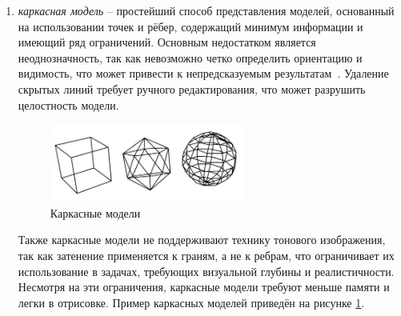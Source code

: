 \begin{enumerate}
	\item \textit{каркасная модель} -- простейший способ представления моделей, основанный на использовании точек и рёбер, содержащий минимум информации и имеющий ряд ограничений. Основным недостатком является неоднозначность, так как невозможно четко определить ориентацию и видимость, что может привести к непредсказуемым результатам~\cite{lit1}. Удаление скрытых линий требует ручного редактирования, что может разрушить целостность модели. 
	\begin{figure}[h] 
		\centering
		\includegraphics[width=0.6\textwidth]{images/carcass-models.png}
		\caption{Каркасные модели} 
		\label{fig:carcass-models} 
	\end{figure}
	Также каркасные модели не поддерживают технику тонового изображения, так как затенение применяется к граням, а не к ребрам, что ограничивает их использование в задачах, требующих визуальной глубины и реалистичности. Несмотря на эти ограничения, каркасные модели требуют меньше памяти и легки в отрисовке. Пример каркасных моделей приведён на рисунке \ref{fig:carcass-models}.
	

\end{enumerate}
